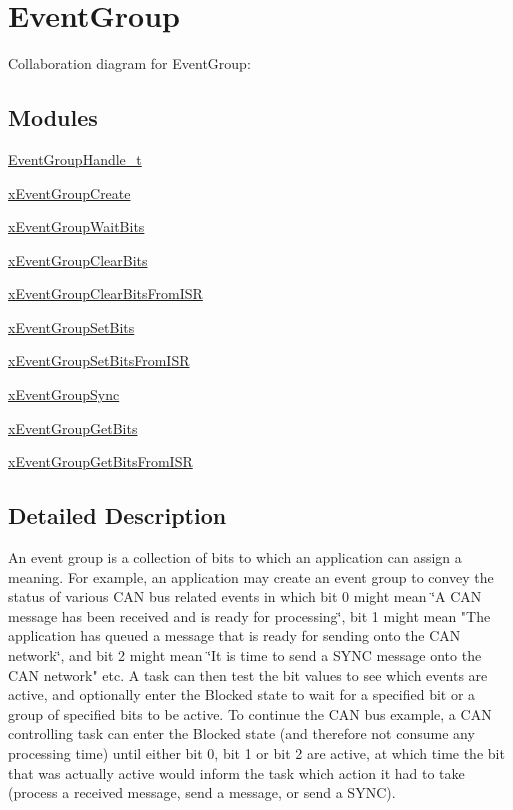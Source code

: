 \hypertarget{group___event_group}{}\section{Event\+Group}
\label{group___event_group}
Collaboration diagram for Event\+Group\+:
\subsection*{Modules}
\begin{DoxyCompactItemize}
\item 
\hyperlink{group___event_group_handle__t}{Event\+Group\+Handle\+\_\+t}
\item 
\hyperlink{group__x_event_group_create}{x\+Event\+Group\+Create}
\item 
\hyperlink{group__x_event_group_wait_bits}{x\+Event\+Group\+Wait\+Bits}
\item 
\hyperlink{group__x_event_group_clear_bits}{x\+Event\+Group\+Clear\+Bits}
\item 
\hyperlink{group__x_event_group_clear_bits_from_i_s_r}{x\+Event\+Group\+Clear\+Bits\+From\+I\+SR}
\item 
\hyperlink{group__x_event_group_set_bits}{x\+Event\+Group\+Set\+Bits}
\item 
\hyperlink{group__x_event_group_set_bits_from_i_s_r}{x\+Event\+Group\+Set\+Bits\+From\+I\+SR}
\item 
\hyperlink{group__x_event_group_sync}{x\+Event\+Group\+Sync}
\item 
\hyperlink{group__x_event_group_get_bits}{x\+Event\+Group\+Get\+Bits}
\item 
\hyperlink{group__x_event_group_get_bits_from_i_s_r}{x\+Event\+Group\+Get\+Bits\+From\+I\+SR}
\end{DoxyCompactItemize}


\subsection{Detailed Description}
An event group is a collection of bits to which an application can assign a meaning. For example, an application may create an event group to convey the status of various C\+AN bus related events in which bit 0 might mean \char`\"{}\+A C\+A\+N
message has been received and is ready for processing\char`\"{}, bit 1 might mean "The application has queued a message that is ready for sending onto the C\+AN network\char`\"{}, and bit 2 might mean \char`\"{}It is time to send a S\+Y\+NC message onto the C\+AN network" etc. A task can then test the bit values to see which events are active, and optionally enter the Blocked state to wait for a specified bit or a group of specified bits to be active. To continue the C\+AN bus example, a C\+AN controlling task can enter the Blocked state (and therefore not consume any processing time) until either bit 0, bit 1 or bit 2 are active, at which time the bit that was actually active would inform the task which action it had to take (process a received message, send a message, or send a S\+Y\+NC).

